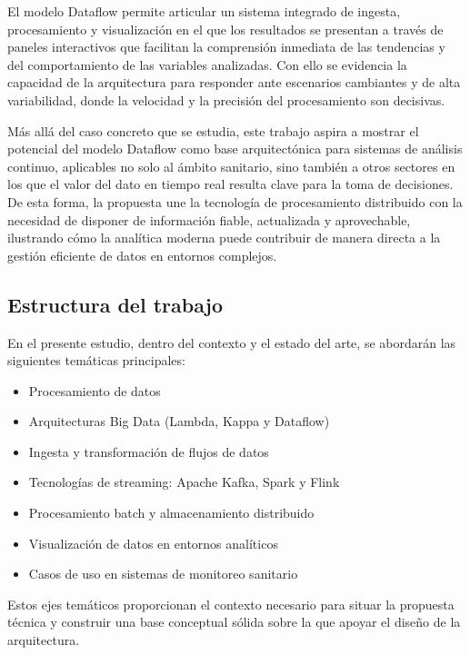 \documentclass[12pt,a4paper]{article}
\providecommand{\tightlist}{%
  \setlength{\itemsep}{0pt}\setlength{\parskip}{0pt}}
\begin{document}
El modelo Dataflow permite articular un sistema integrado de ingesta, procesamiento y visualización en el que los resultados se presentan a través de paneles interactivos que facilitan la comprensión inmediata de las tendencias y del comportamiento de las variables analizadas. Con ello se evidencia la capacidad de la arquitectura para responder ante escenarios cambiantes y de alta variabilidad, donde la velocidad y la precisión del procesamiento son decisivas.

Más allá del caso concreto que se estudia, este trabajo aspira a mostrar el potencial del modelo Dataflow como base arquitectónica para sistemas de análisis continuo, aplicables no solo al ámbito sanitario, sino también a otros sectores en los que el valor del dato en tiempo real resulta clave para la toma de decisiones. De esta forma, la propuesta une la tecnología de procesamiento distribuido con la necesidad de disponer de información fiable, actualizada y aprovechable, ilustrando cómo la analítica moderna puede contribuir de manera directa a la gestión eficiente de datos en entornos complejos.

\subsection{Estructura del trabajo}\label{estructura-del-trabajo}

En el presente estudio, dentro del contexto y el estado del arte, se abordarán las siguientes temáticas principales:

\begin{itemize}
    \tightlist
    \item
          Procesamiento de datos
    \item
          Arquitecturas Big Data (Lambda, Kappa y Dataflow)
    \item
          Ingesta y transformación de flujos de datos
    \item
          Tecnologías de streaming: Apache Kafka, Spark y Flink
    \item
          Procesamiento batch y almacenamiento distribuido
    \item
          Visualización de datos en entornos analíticos
    \item
          Casos de uso en sistemas de monitoreo sanitario
\end{itemize}

Estos ejes temáticos proporcionan el contexto necesario para situar la propuesta técnica y construir una base conceptual sólida sobre la que apoyar el diseño de la arquitectura.
\end{document}
